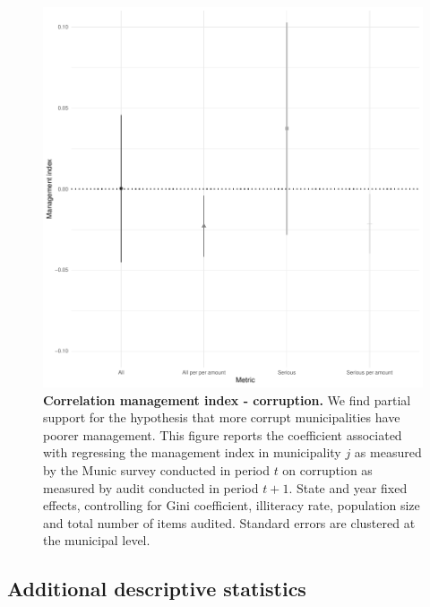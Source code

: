 \documentclass[12pt,a4paper]{article}
\theoremstyle{definition}
\begin{document}
{\begin{figure}[H]
    \centering
    \includegraphics{figures/managementCorruption.pdf}
    \caption{{\bf Correlation management index - corruption.} We find partial support for the hypothesis that more corrupt municipalities have poorer management. This figure reports the coefficient associated with regressing the management index in municipality $j$ as measured by the Munic survey conducted in period $t$ on corruption as measured by audit conducted in period $t+1$. State and year fixed effects, controlling for Gini coefficient, illiteracy rate, population size and total number of items audited. Standard errors are clustered at the municipal level.}
    \label{fig:correlationMgmtCorruption}
\end{figure}

\subsection{Additional descriptive statistics}
\label{app:additional_descriptives}

}
\end{document}
